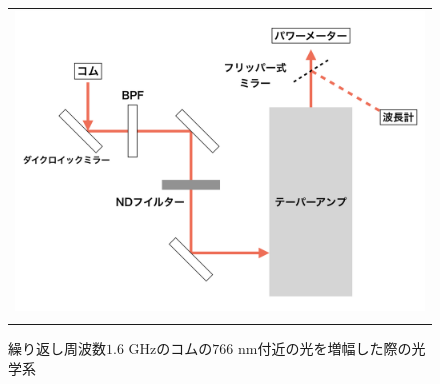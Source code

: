 \documentclass[uplatex, dvipdfmx, a4paper, report, papersize, 11pt]{jsbook}
\begin{document}
\begin{figure}[htpb]
\begin{tabular}{c}
      \begin{minipage}{0.5\hsize}
        \centering
          \includegraphics[keepaspectratio,  scale=0.33,  angle=0]
                          {figures/chapter4/760_astro_amp_diagram.png}
                          \caption{繰り返し周波数$1.6$ GHzのコムの$766$ nm付近の光を増幅した際の光学系}
                          \label{760_astro_amp_diagram}
      \end{minipage}\\
      \\


\end{tabular}
\end{figure}
\end{document}
